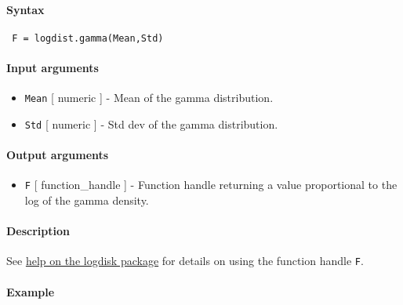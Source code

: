 


	\paragraph{Syntax}
 
 \begin{verbatim}
 F = logdist.gamma(Mean,Std)
 \end{verbatim}
 
 \paragraph{Input arguments}
 
 \begin{itemize}
 \item
   \texttt{Mean} {[} numeric {]} - Mean of the gamma distribution.
 \item
   \texttt{Std} {[} numeric {]} - Std dev of the gamma distribution.
 \end{itemize}
 
 \paragraph{Output arguments}
 
 \begin{itemize}
 \item
   \texttt{F} {[} function\_handle {]} - Function handle returning a
   value proportional to the log of the gamma density.
 \end{itemize}
 
 \paragraph{Description}
 
 See \href{logdist/Contents}{help on the logdisk package} for details on
 using the function handle \texttt{F}.
 
 \paragraph{Example}


